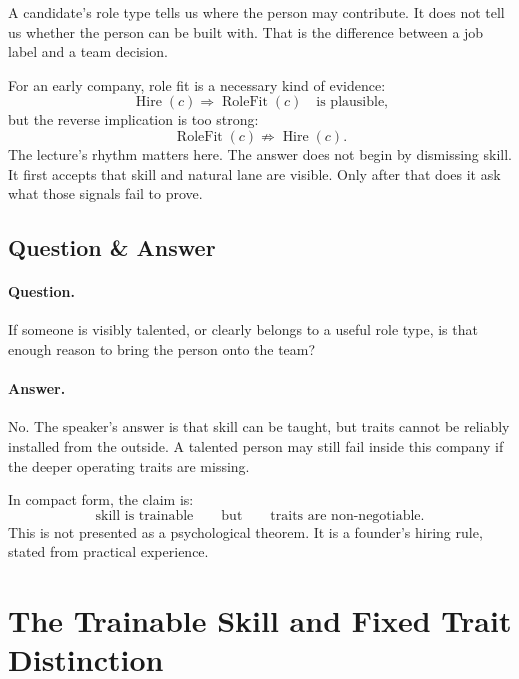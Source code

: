 A candidate's role type tells us where the person may contribute. It does not tell us whether the person can be built with. That is the difference between a job label and a team decision.

For an early company, role fit is a necessary kind of evidence:
\begin{equation}
  \operatorname{Hire}(c) \Rightarrow \operatorname{RoleFit}(c)
  \quad\text{is plausible,}
\end{equation}
but the reverse implication is too strong:
\begin{equation}
  \operatorname{RoleFit}(c) \nRightarrow \operatorname{Hire}(c).
\end{equation}
The lecture's rhythm matters here. The answer does not begin by dismissing skill. It first accepts that skill and natural lane are visible. Only after that does it ask what those signals fail to prove.

\subsection{Question \& Answer}

\paragraph{Question.}
If someone is visibly talented, or clearly belongs to a useful role type, is that enough reason to bring the person onto the team?

\paragraph{Answer.}
No. The speaker's answer is that skill can be taught, but traits cannot be reliably installed from the outside. A talented person may still fail inside this company if the deeper operating traits are missing.

In compact form, the claim is:
\begin{equation}
  \text{skill is trainable}
  \qquad\text{but}\qquad
  \text{traits are non-negotiable}.
\end{equation}
This is not presented as a psychological theorem. It is a founder's hiring rule, stated from practical experience.

\section{The Trainable Skill and Fixed Trait Distinction}

